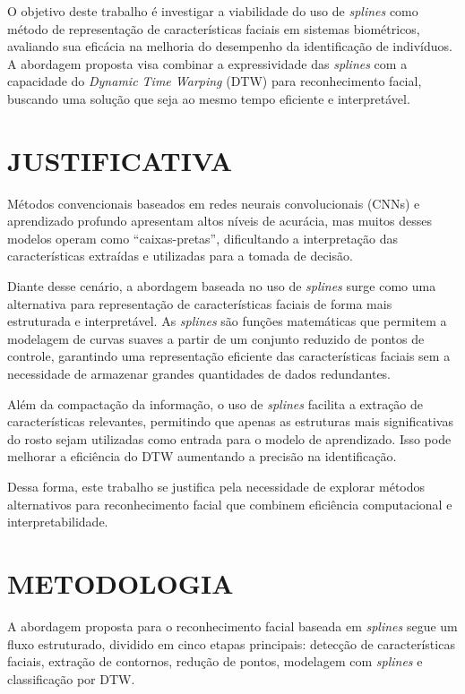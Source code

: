 O objetivo deste trabalho é investigar a viabilidade do uso de \textit{splines} como método de representação de características faciais em sistemas biométricos, avaliando sua eficácia na melhoria do desempenho da identificação de indivíduos. A abordagem proposta visa combinar a expressividade das \textit{splines} com a capacidade do \textit{Dynamic Time Warping} (DTW) para reconhecimento facial, buscando uma solução que seja ao mesmo tempo eficiente e interpretável.

\section{JUSTIFICATIVA}

Métodos convencionais baseados em redes neurais convolucionais (CNNs) e aprendizado profundo apresentam altos níveis de acurácia, mas muitos desses modelos operam como “caixas-pretas”, dificultando a interpretação das características extraídas e utilizadas para a tomada de decisão.

Diante desse cenário, a abordagem baseada no uso de \textit{splines} surge como uma alternativa para representação de características faciais de forma mais estruturada e interpretável. As \textit{splines} são funções matemáticas que permitem a modelagem de curvas suaves a partir de um conjunto reduzido de pontos de controle, garantindo uma representação eficiente das características faciais sem a necessidade de armazenar grandes quantidades de dados redundantes.

Além da compactação da informação, o uso de \textit{splines} facilita a extração de características relevantes, permitindo que apenas as estruturas mais significativas do rosto sejam utilizadas como entrada para o modelo de aprendizado. Isso pode melhorar a eficiência do DTW aumentando a precisão na identificação.

Dessa forma, este trabalho se justifica pela necessidade de explorar métodos alternativos para reconhecimento facial que combinem eficiência computacional e interpretabilidade.

\section{METODOLOGIA}

A abordagem proposta para o reconhecimento facial baseada em \textit{splines} segue um fluxo estruturado, dividido em cinco etapas principais: detecção de características faciais, extração de contornos, redução de pontos, modelagem com \textit{splines} e classificação por DTW.


